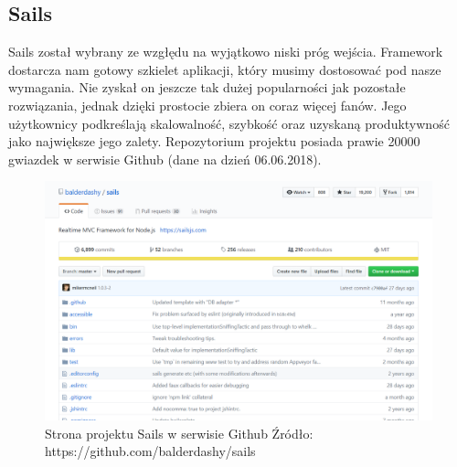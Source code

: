 \documentclass[12pt]{report}
\begin{document}
    \subsection{Sails}
      Sails został wybrany ze wzgłędu na wyjątkowo niski próg wejścia.
      Framework dostarcza nam gotowy szkielet aplikacji, który musimy dostosować pod nasze wymagania.
      Nie zyskał on jeszcze tak dużej popularności jak pozostałe rozwiązania, jednak dzięki prostocie zbiera on coraz więcej fanów.
      Jego użytkownicy podkreślają skalowalność, szybkość oraz uzyskaną produktywność jako największe jego zalety.
      Repozytorium projektu posiada prawie 20000 gwiazdek w serwisie Github (dane na dzień 06.06.2018).
      \begin{figure}[!hb]
        \centering
        \includegraphics[width=\textwidth,height=\textheight,keepaspectratio]{sails.png} 
        \caption{Strona projektu Sails w serwisie Github \newline Źródło: https://github.com/balderdashy/sails}
      \end{figure}
    \pagebreak
    
\end{document}
